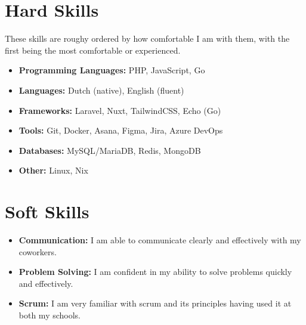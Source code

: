 \documentclass{article}
\begin{document}
\section*{Hard Skills}
These skills are roughy ordered by how comfortable I am with them, with the first being the most comfortable or experienced.
\begin{itemize}[noitemsep]
    \item \textbf{Programming Languages:} PHP, JavaScript, Go
    \item \textbf{Languages:} Dutch (native), English (fluent)
    \item \textbf{Frameworks:} Laravel, Nuxt, TailwindCSS, Echo (Go)
    \item \textbf{Tools:} Git, Docker, Asana, Figma, Jira, Azure DevOps
    \item \textbf{Databases:} MySQL/MariaDB, Redis, MongoDB
    \item \textbf{Other:} Linux, Nix
\end{itemize}

\section*{Soft Skills}
\begin{itemize}[noitemsep]
    \item \textbf{Communication:} I am able to communicate clearly and effectively with my coworkers.
    \item \textbf{Problem Solving:} I am confident in my ability to solve problems quickly and effectively.
    \item \textbf{Scrum:} I am very familiar with scrum and its principles having used it at both my schools.
\end{itemize}
\end{document}
